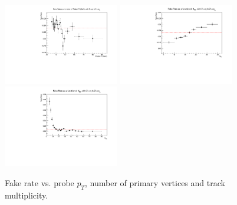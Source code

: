 \begin{figure}[H]
\begin{center}
{\label{FR_pt}\includegraphics[width=0.45\textwidth]{efake_figs/FakeRate_Pt.pdf}}
{\label{FR_pu}\includegraphics[width=0.45\textwidth]{efake_figs/FakeRate_PU.pdf}}
\\
{\label{FR_trk}\includegraphics[width=0.45\textwidth]{efake_figs/FakeRate_Trk.pdf}}
\caption{Fake rate vs. probe $p_T$, number of primary vertices and track multiplicity.}
\label{FR_all}
\end{center}
\end{figure}
%


